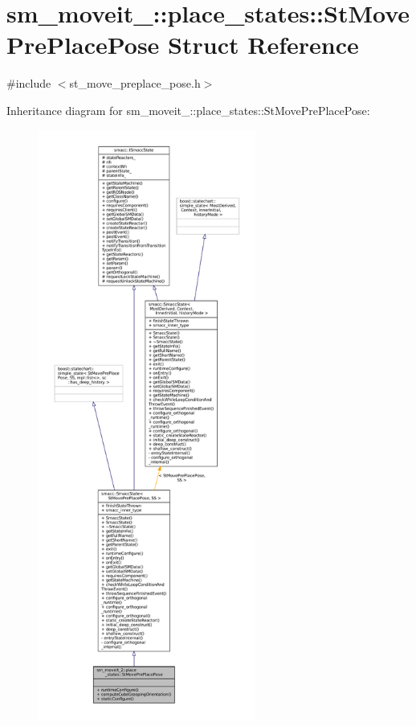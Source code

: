 \hypertarget{structsm__moveit__2_1_1place__states_1_1StMovePrePlacePose}{}\section{sm\+\_\+moveit\+\_\+:\+:place\+\_\+states\+:\+:St\+Move\+Pre\+Place\+Pose Struct Reference}
\label{structsm__moveit__2_1_1place__states_1_1StMovePrePlacePose}


{\ttfamily \#include $<$st\+\_\+move\+\_\+preplace\+\_\+pose.\+h$>$}



Inheritance diagram for sm\+\_\+moveit\+\_\+:\+:place\+\_\+states\+:\+:St\+Move\+Pre\+Place\+Pose\+:
\nopagebreak
\begin{figure}[H]
\begin{center}
\leavevmode
\includegraphics[height=550pt]{structsm__moveit__2_1_1place__states_1_1StMovePrePlacePose__inherit__graph}
\end{center}
\end{figure}


